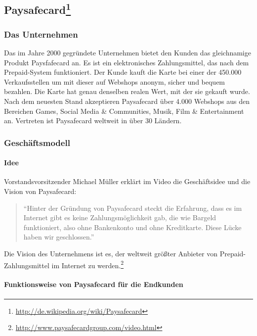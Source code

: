 \subsection[Paysafecard]{Paysafecard\footnote{\url{http://de.wikipedia.org/wiki/Paysafecard}}}
\subsubsection{Das Unternehmen}
Das im Jahre 2000 gegründete Unternehmen bietet den Kunden das gleichnamige Produkt Paysfafecard an. Es ist ein elektronisches Zahlungsmittel, das nach dem Prepaid-System funktioniert. Der Kunde kauft die Karte bei einer der 450.000 Verkaufsstellen um mit dieser auf Webshops anonym, sicher und bequem bezahlen. Die Karte hat genau denselben realen Wert, mit der sie gekauft wurde. Nach dem neuesten Stand akzeptieren Paysafecard über 4.000 Webshops aus den Bereichen Games, Social Media \& Communities, Musik, Film \& Entertainment an. Vertreten ist Paysafecard weltweit in über 30 Ländern.



\subsubsection{Geschäftsmodell}

\paragraph{Idee}\label{idee}

Vorstandsvorsitzender Michael Müller erklärt im Video die Geschäfts\-idee und die Vision von Paysafecard:
\begin{quote}
``Hinter der Gründung von Paysafecard steckt die Erfahrung, dass es im Internet gibt es keine Zahlungsmöglichkeit gab, die wie Bargeld funktioniert, also ohne Bankenkonto und ohne Kreditkarte. Diese Lücke haben wir geschlossen.''
\end{quote}
Die Vision des Unternehmens ist es, der weltweit größter Anbieter von Pre\-paid-Zahlungsmittel im Internet zu werden.\footnote{\url{ http://www.paysafecardgroup.com/video.html}}


\paragraph{Funktionsweise von Paysafecard für die Endkunden}

